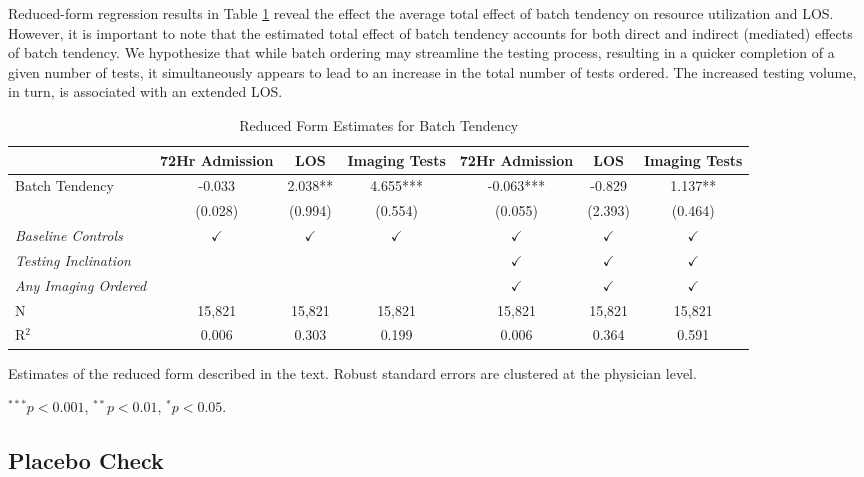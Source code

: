 \documentclass{article}
\begin{document}
Reduced-form regression results in Table \ref{table:reduced_form} reveal
the effect the average total effect of batch tendency on resource
utilization and LOS. However, it is important to note that the estimated
total effect of batch tendency accounts for both direct and indirect
(mediated) effects of batch tendency. We hypothesize that while batch
ordering may streamline the testing process, resulting in a quicker
completion of a given number of tests, it simultaneously appears to lead
to an increase in the total number of tests ordered. The increased
testing volume, in turn, is associated with an extended LOS.

\begin{table}[!htbp] 
\centering 
\caption{Reduced Form Estimates for Batch Tendency}
\label{table:reduced_form}
\small
\begin{threeparttable}
\begin{tabular}{lcccccc}
\toprule
 & 72Hr Admission & LOS & Imaging Tests & 72Hr Admission & LOS & Imaging Tests \\
\midrule
Batch Tendency & -0.033 & 2.038** & 4.655*** & -0.063*** & -0.829 & 1.137** \\
 & (0.028) & (0.994) & (0.554) & (0.055) & (2.393) & (0.464) \\
\textit{Baseline Controls} & $\checkmark$ & $\checkmark$ & $\checkmark$ &  $\checkmark$ & $\checkmark$ & $\checkmark$\\
\textit{Testing Inclination} &  &  &  &  $\checkmark$ & $\checkmark$ & $\checkmark$\\
\textit{Any Imaging Ordered} &  &  &  &  $\checkmark$ & $\checkmark$ & $\checkmark$\\
\midrule
N & 15,821 & 15,821 & 15,821 & 15,821 & 15,821 & 15,821 \\
R$^2$ & 0.006 & 0.303 & 0.199 & 0.006 & 0.364 & 0.591 \\
\bottomrule
\end{tabular}
\begin{tablenotes}
\small
\item Estimates of the reduced form described in the text. Robust standard errors are clustered at the physician level.
\item $^{***} p < 0.001$, $^{**} p < 0.01$, $^{*} p < 0.05$.
\end{tablenotes}
\end{threeparttable}
\end{table}

\hypertarget{placebo-check}{%
\subsection{Placebo Check}\label{placebo-check}}
\end{document}
